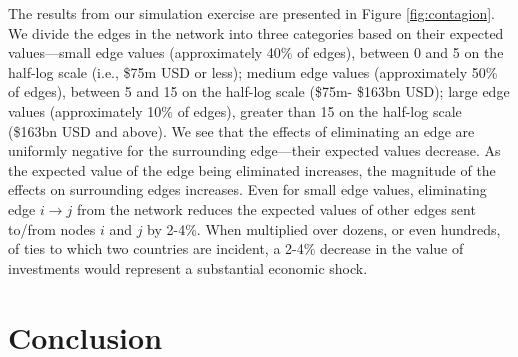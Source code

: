\documentclass[reqno,onecolumn,letterpaper,12pt]{article}
\begin{document}
The results from our simulation exercise are presented in Figure \ref{fig:contagion}. We divide the edges in the network into three categories based on their expected values---small edge values (approximately 40\% of edges), between 0 and 5 on the half-log scale (i.e., \$75m USD or less); medium edge values (approximately 50\% of edges), between 5 and 15 on the half-log scale (\$75m- \$163bn USD); large edge values (approximately 10\% of edges), greater than 15 on the half-log scale (\$163bn USD and above). We see that the effects of eliminating an edge are uniformly negative for the surrounding edge---their expected values decrease.  As the expected value of the edge being eliminated increases, the magnitude of the effects on surrounding edges increases. Even for small edge values, eliminating edge $i \rightarrow j$ from the network reduces the expected values of other edges sent to/from nodes $i$ and $j$ by 2-4\%. When multiplied over dozens, or even hundreds, of ties to which two countries are incident, a 2-4\% decrease in the value of investments would represent a substantial economic shock. %









\section{Conclusion}
\end{document}
